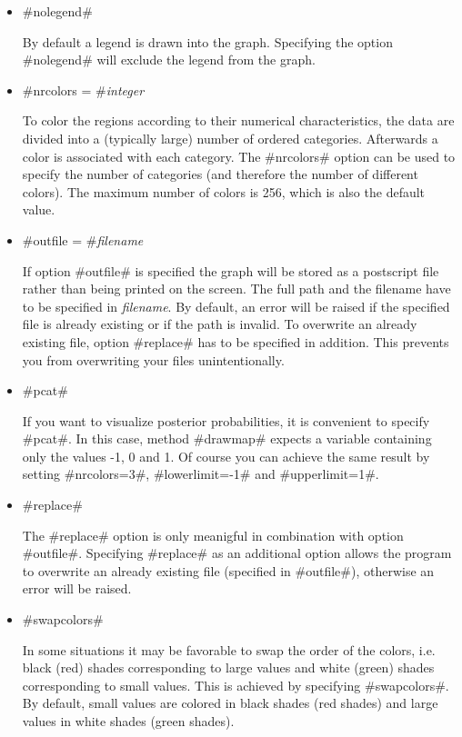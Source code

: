 \begin{itemize}
{\em mapname} specifies the name of the {\em map object}
containing the boundary information to be drawn. This option is
obligatory.

\item #nolegend#

By default a legend is drawn into the graph. Specifying the option
#nolegend# will exclude the legend from the graph.

\item #nrcolors = #{\em integer}

To color the regions according to their numerical characteristics,
the data are divided into a (typically large) number of ordered
categories. Afterwards a color is associated with each category.
The #nrcolors# option can be used to specify the number of
categories (and therefore the number of different colors). The
maximum number of colors is 256, which is also the default value.

\item #outfile = #{\em filename}

If option #outfile# is specified the graph will be stored as a
postscript file rather than being printed on the screen. The full
path and the filename have to be specified in {\em filename}. By
default, an error will be raised if the specified file is already
existing or if the path is invalid. To overwrite  an already
existing file, option #replace# has to be specified in addition.
This prevents you from overwriting your files unintentionally.

\item #pcat#

If you want to visualize posterior probabilities, it is convenient
to specify #pcat#. In this case, method #drawmap# expects a
variable containing only the values -1, 0 and 1. Of course you can
achieve the same result by setting #nrcolors=3#, #lowerlimit=-1#
and #upperlimit=1#.

\item #replace#

The #replace# option is only meanigful in combination with option
#outfile#. Specifying #replace# as an additional option allows the
program to overwrite an already existing file (specified in
#outfile#), otherwise an error will be raised.

\item #swapcolors#

In some situations it may be favorable to swap the order of the
colors, i.e. black (red) shades corresponding to large values and
white (green) shades corresponding to small values. This is
achieved by specifying #swapcolors#. By default, small values are
colored in black shades (red shades) and large values in white
shades (green shades).


\end{itemize}
